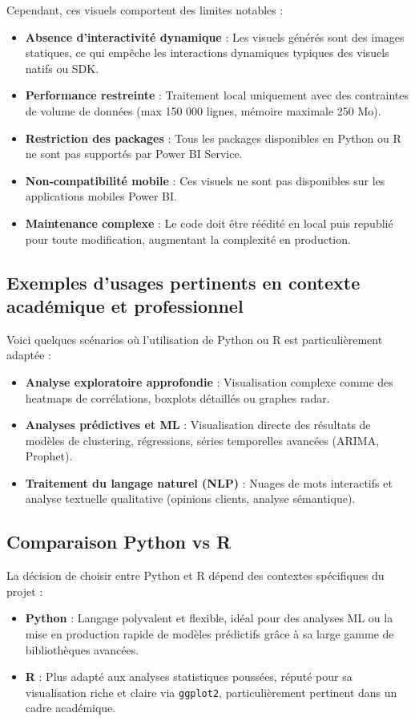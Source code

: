 Cependant, ces visuels comportent des limites notables :
\begin{itemize}
\item \textbf{Absence d’interactivité dynamique} : Les visuels générés sont des images statiques, ce qui empêche les interactions dynamiques typiques des visuels natifs ou SDK.
\item \textbf{Performance restreinte} : Traitement local uniquement avec des contraintes de volume de données (max 150 000 lignes, mémoire maximale 250 Mo).
\item \textbf{Restriction des packages} : Tous les packages disponibles en Python ou R ne sont pas supportés par Power BI Service.
\item \textbf{Non-compatibilité mobile} : Ces visuels ne sont pas disponibles sur les applications mobiles Power BI.
\item \textbf{Maintenance complexe} : Le code doit être réédité en local puis republié pour toute modification, augmentant la complexité en production.
\end{itemize}

\subsection{Exemples d’usages pertinents en contexte académique et professionnel}

Voici quelques scénarios où l’utilisation de Python ou R est particulièrement adaptée :
\begin{itemize}
\item \textbf{Analyse exploratoire approfondie} : Visualisation complexe comme des heatmaps de corrélations, boxplots détaillés ou graphes radar.
\item \textbf{Analyses prédictives et ML} : Visualisation directe des résultats de modèles de clustering, régressions, séries temporelles avancées (ARIMA, Prophet).
\item \textbf{Traitement du langage naturel (NLP)} : Nuages de mots interactifs et analyse textuelle qualitative (opinions clients, analyse sémantique).
\end{itemize}

\subsection{Comparaison Python vs R}

La décision de choisir entre Python et R dépend des contextes spécifiques du projet :
\begin{itemize}
\item \textbf{Python} : Langage polyvalent et flexible, idéal pour des analyses ML ou la mise en production rapide de modèles prédictifs grâce à sa large gamme de bibliothèques avancées.
\item \textbf{R} : Plus adapté aux analyses statistiques poussées, réputé pour sa visualisation riche et claire via \texttt{ggplot2}, particulièrement pertinent dans un cadre académique.
\end{itemize}

